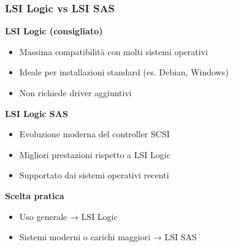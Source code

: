 \documentclass{beamer}
\begin{document}
	\begin{frame}
		\frametitle{LSI Logic vs LSI SAS}
		
		\textbf{LSI Logic (consigliato)}
		\begin{itemize}
			\item Massima compatibilità con molti sistemi operativi
			\item Ideale per installazioni standard (es. Debian, Windows)
			\item Non richiede driver aggiuntivi
		\end{itemize}
		
		\vspace{0.4cm}
		
		\textbf{LSI Logic SAS}
		\begin{itemize}
			\item Evoluzione moderna del controller SCSI
			\item Migliori prestazioni rispetto a LSI Logic
			\item Supportato dai sistemi operativi recenti
		\end{itemize}
		
		\vspace{0.4cm}
		
		\textbf{Scelta pratica}
		\begin{itemize}
			\item Uso  generale → LSI Logic
			\item Sistemi moderni o carichi maggiori → LSI SAS
		\end{itemize}
		
	\end{frame}
	
	
\end{document}
